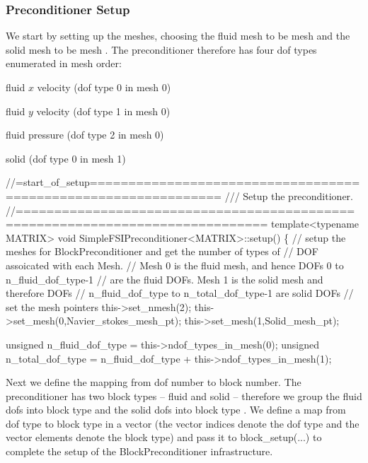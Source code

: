 \hypertarget{index_setup}{}\subsubsection{Preconditioner Setup}\label{index_setup}
We start by setting up the meshes, choosing the fluid mesh to be mesh {} and the solid mesh to be mesh {}. The preconditioner therefore has four dof types enumerated in mesh order\+:


\begin{DoxyItemize}
\item {} fluid $x$ velocity (dof type 0 in mesh 0)
\item {} fluid $y$ velocity (dof type 1 in mesh 0)
\item {} fluid pressure (dof type 2 in mesh 0)
\item {} solid (dof type 0 in mesh 1)
\end{DoxyItemize}

 
\begin{DoxyCodeInclude}
\textcolor{comment}{//=start\_of\_setup===============================================================}
\textcolor{comment}{/// Setup the preconditioner.}
\textcolor{comment}{}\textcolor{comment}{//==============================================================================}
 \textcolor{keyword}{template}<\textcolor{keyword}{typename} MATRIX> 
 \textcolor{keywordtype}{void} SimpleFSIPreconditioner<MATRIX>::setup()
\{
 \textcolor{comment}{// setup the meshes for BlockPreconditioner and get the number of types of}
 \textcolor{comment}{// DOF assoicated with each Mesh.}
 \textcolor{comment}{// Mesh 0 is the fluid mesh, and hence DOFs 0 to n\_fluid\_dof\_type-1 }
 \textcolor{comment}{// are the fluid DOFs. Mesh 1 is the solid mesh and therefore DOFs }
 \textcolor{comment}{// n\_fluid\_dof\_type to n\_total\_dof\_type-1 are solid DOFs}
 \textcolor{comment}{// set the mesh pointers}
 this->set\_nmesh(2);
 this->set\_mesh(0,Navier\_stokes\_mesh\_pt);
 this->set\_mesh(1,Solid\_mesh\_pt);
 
 \textcolor{keywordtype}{unsigned} n\_fluid\_dof\_type = this->ndof\_types\_in\_mesh(0);
 \textcolor{keywordtype}{unsigned} n\_total\_dof\_type = n\_fluid\_dof\_type + this->ndof\_types\_in\_mesh(1);

\end{DoxyCodeInclude}


Next we define the mapping from dof number to block number. The preconditioner has two block types -- fluid and solid -- therefore we group the fluid dofs into block type {} and the solid dofs into block type {}. We define a map from dof type to block type in a vector (the vector indices denote the dof type and the vector elements denote the block type) and pass it to {\ttfamily block\+\_\+setup}(...) to complete the setup of the {\ttfamily Block\+Preconditioner} infrastructure.

